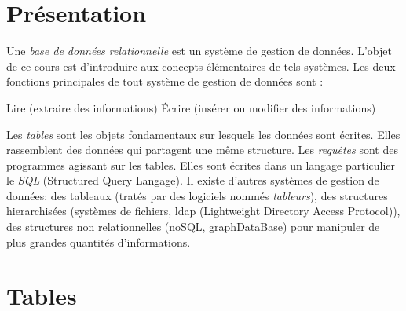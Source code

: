 

\section{Présentation}
Une \emph{base de données relationnelle} est un système de gestion de données. L'objet de ce cours est d'introduire aux concepts élémentaires de tels systèmes.\newline
Les deux fonctions principales de tout système de gestion de données sont :
\begin{center}
 Lire (extraire des informations) \hfill \'Ecrire (insérer ou modifier des informations)
\end{center}
Les \emph{tables} sont les objets fondamentaux sur lesquels les données sont écrites. Elles rassemblent des données qui partagent une même structure. Les \emph{requêtes} sont des programmes agissant sur les tables. Elles sont écrites dans un langage particulier le \emph{SQL} (Structured Query Langage).\newline
Il existe d'autres systèmes de gestion de données: des tableaux (tratés par des logiciels nommés \emph{tableurs}),
des structures hierarchisées (systèmes de fichiers, ldap (Lightweight Directory Access Protocol)), des structures non relationnelles (noSQL, graphDataBase) pour manipuler de plus grandes quantités d'informations.
  
\section{Tables}
